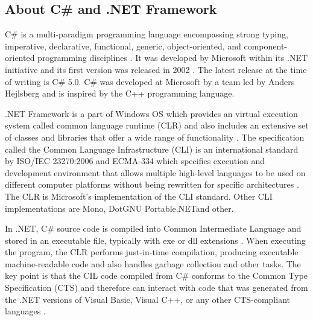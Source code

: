 \subsection{About C\# and .NET Framework}
C\# is a multi-paradigm programming language encompassing strong typing, imperative, declarative, functional, generic, object-oriented, and component-oriented programming disciplines \cite{cs1.0specs}. It was developed by Microsoft within its .NET initiative and its first version was released in 2002 \cite{cs1.0specs}. The latest release at the time of writing is C\# 5.0.
C\# was developed at Microsoft by a team led by Anders Hejlsberg and is inspired by the C++ programming language.

.NET Framework is a part of Windows OS which provides an virtual execution system called common language runtime (CLR) and also includes an extensive set of classes and libraries that offer a wide range of functionality \cite{csAndDotNet}. The specification called the Common Language Infrastructure (CLI) is an international standard by ISO/IEC 23270:2006 and ECMA-334 which specifies execution and development environment that allows multiple high-level languages to be used on different computer platforms without being rewritten for specific architectures \cite{csAndDotNet}. The CLR is Microsoft's implementation of the CLI standard. Other CLI implementations are Mono\footnotemark[1], DotGNU Portable.NET\footnotemark[2] and other.

In .NET, C\# source code is compiled into Common Intermediate Language and stored in an executable file, typically with exe or dll extensions \cite{csAndDotNet}. When executing the program, the CLR performs just-in-time compilation, producing executable machine-readable code and also handles garbage collection and other tasks. The key point is that the CIL code compiled from C\# conforms to the Common Type Specification (CTS) and therefore can interact with code that was generated from the .NET versions of Visual Basic, Visual C++, or any other CTS-compliant languages \cite{csAndDotNet}.



